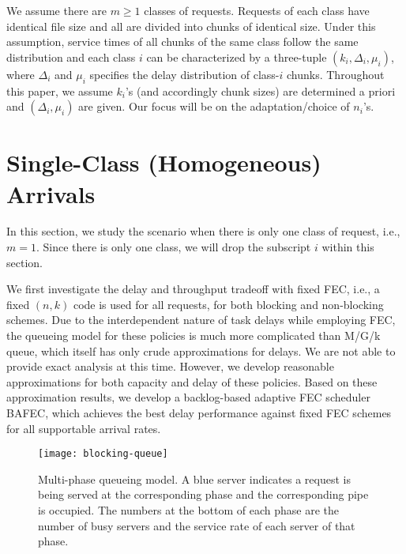 \documentclass[journal]{IEEEtran}
\newcommand{\nonBlocking}{{BAFEC}\xspace}
\begin{document}
We assume there are $m\ge 1$ classes of requests. Requests of each class have identical file size  and all are divided into chunks of identical size. Under this assumption, service times of all chunks of the same class follow the same distribution and each class $i$ can be characterized by a three-tuple $(k_i,\Delta_i,\mu_i)$, where $\Delta_i$ and $\mu_i$ specifies the delay distribution of class-$i$ chunks.
Throughout this paper, we assume $k_i$'s (and accordingly chunk sizes) are determined a priori and $(\Delta_i,\mu_i)$ are given. Our focus will be on the adaptation/choice of $n_i$'s.  


\newcommand{\appxC}{\tilde{C}}
\newcommand{\appxD}{\tilde{D}}

\section{Single-Class (Homogeneous) Arrivals}
\label{sec:singletype}
In this section, we study the scenario when there is only one class of request, i.e., $m=1$. Since there is only one class, we will drop the subscript $i$ within this section.

We first investigate the delay and throughput tradeoff with fixed FEC, i.e., a fixed $(n,k)$ code is used for all requests, for both blocking and non-blocking schemes. Due to the interdependent nature of task delays while employing FEC, the queueing model for these policies is much more complicated than M/G/k queue, which itself has only crude approximations for delays. We are not able to provide exact analysis at this time. However, we develop reasonable approximations for both capacity and delay of these policies. Based on these approximation results, we develop a backlog-based adaptive FEC scheduler \nonBlocking, which achieves the best delay performance against fixed FEC schemes for all supportable arrival rates. 


\begin{figure}[t]
\centering
\texttt{[image: blocking-queue]}
\vspace{-20pt}
\caption{Multi-phase queueing model. A blue server indicates a request is being served at the corresponding phase and the corresponding pipe is occupied. The numbers at the bottom of each phase are the number of busy servers and the service rate of each server of that phase.}
\label{fig:blocking}
\vspace{-10pt}
\end{figure}
\end{document}
